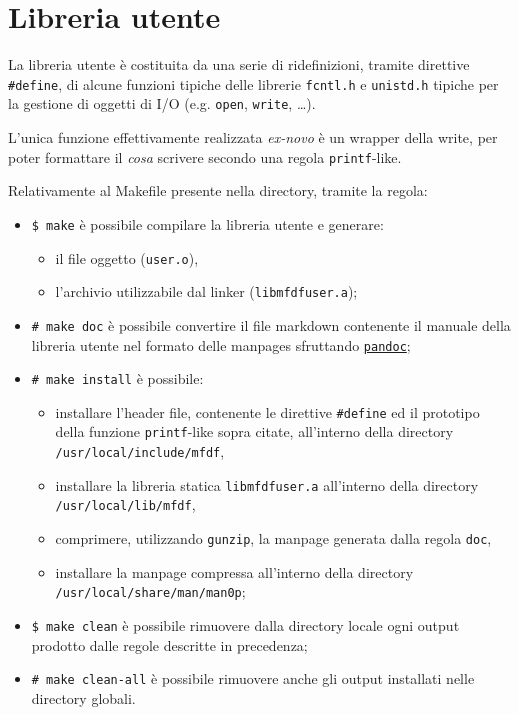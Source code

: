 \documentclass{article}
\newcommand{\terminal}[1]{\colorbox{tn-bg}{\textcolor{tn-fg}{\texttt{#1}}}}
\begin{document}
\section{Libreria utente}
La libreria utente è costituita da una serie di ridefinizioni, tramite direttive \texttt{\#define}, di alcune funzioni tipiche delle librerie \texttt{fcntl.h} e \texttt{unistd.h} tipiche per la gestione di oggetti di I/O (e.g. \texttt{open}, \texttt{write}, \dots).

L'unica funzione effettivamente realizzata \textit{ex-novo} è un wrapper della write, per poter formattare il \textit{cosa} scrivere secondo una regola \texttt{printf}-like.

Relativamente al Makefile presente nella directory, tramite la regola:
\begin{itemize}
        \item \terminal{\$ make} è possibile compilare la libreria utente e generare:
                \begin{itemize}
                        \item il file oggetto (\texttt{user.o}),
                        \item l'archivio utilizzabile dal linker (\texttt{libmfdfuser.a});
                \end{itemize}
        \item \terminal{\# make doc} è possibile convertire il file markdown contenente il manuale della libreria utente nel formato delle manpages sfruttando \href{https://pandoc.org/}{\texttt{pandoc}};
        \item \terminal{\# make install} è possibile:
                \begin{itemize}
                        \item installare l'header file, contenente le direttive \texttt{\#define} ed il prototipo della funzione \texttt{printf}-like sopra citate, all'interno della directory \texttt{/usr/local/include/mfdf},
                        \item installare la libreria statica \texttt{libmfdfuser.a} all'interno della directory \texttt{/usr/local/lib/mfdf},
                        \item comprimere, utilizzando \texttt{gunzip}, la manpage generata dalla regola \texttt{doc},
                        \item installare la manpage compressa all'interno della directory \texttt{/usr/local/share/man/man0p};
                \end{itemize}
        \item \terminal{\$ make clean} è possibile rimuovere dalla directory locale ogni output prodotto dalle regole descritte in precedenza;
        \item \terminal{\# make clean-all} è possibile rimuovere anche gli output installati nelle directory globali.
\end{itemize}
\end{document}
